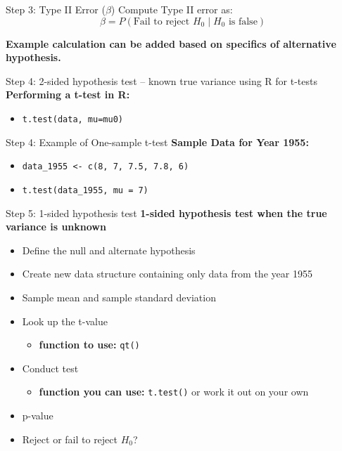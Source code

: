 \documentclass{beamer}
\begin{document}
\begin{frame}{Step 3: Type II Error ($\beta$)}
Compute Type II error as:
\[\beta = P(\text{Fail to reject } H_0 \mid H_0 \text{ is false})\]

\textbf{Example calculation can be added based on specifics of alternative hypothesis.}
\end{frame}

\begin{frame}{Step 4: 2-sided hypothesis test – known true variance using R for t-tests}
\textbf{Performing a t-test in R:}
\begin{itemize}
    \item \texttt{t.test(data, mu=mu0)}
\end{itemize}
\end{frame}

\begin{frame}{Step 4: Example of One-sample t-test}
\textbf{Sample Data for Year 1955:}
\begin{itemize}
    \item \texttt{data\_1955 <- c(8, 7, 7.5, 7.8, 6)}
    \item \texttt{t.test(data\_1955, mu = 7)}
\end{itemize}
\end{frame}

\begin{frame}{Step 5: 1-sided hypothesis test}
\textbf{1-sided hypothesis test when the true variance is unknown}
\begin{itemize}
    \item Define the null and alternate hypothesis
    \item Create new data structure containing only data from the year 1955
    \item Sample mean and sample standard deviation
    \item Look up the t-value
    \begin{itemize}
        \item \textbf{function to use:} \texttt{qt()}
    \end{itemize}
    \item Conduct test
    \begin{itemize}
        \item \textbf{function you can use:} \texttt{t.test()} or work it out on your own
    \end{itemize}
    \item p-value
    \item Reject or fail to reject \(H_0\)?
\end{itemize}
\end{frame}
\end{document}

